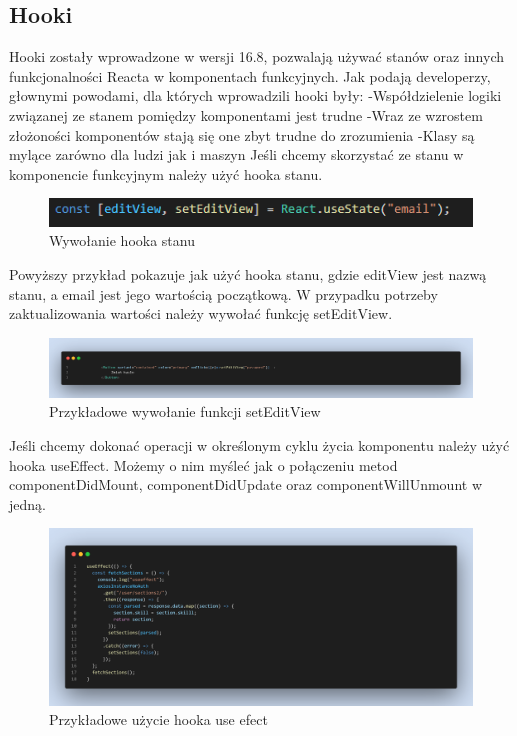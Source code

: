 \documentclass[oneside,polski,logo,indent]{amuthesis}
\begin{document}
\begin{enumerate}
\begin{enumerate}
\begin{figure}[H]
\end{figure}


\subsection{Hooki}
Hooki zostały wprowadzone w wersji 16.8, pozwalają używać stanów oraz innych funkcjonalności Reacta w komponentach funkcyjnych.
\newline
Jak podają developerzy, głownymi powodami, dla których wprowadzili hooki były:
\newline -Współdzielenie logiki związanej ze stanem pomiędzy komponentami jest trudne
\newline -Wraz ze wzrostem złożoności komponentów stają się one zbyt trudne do zrozumienia
\newline -Klasy są mylące zarówno dla ludzi jak i maszyn
\newline
Jeśli chcemy skorzystać ze stanu w komponencie funkcyjnym należy użyć hooka stanu.

\begin{figure}[H]
\centering
\includegraphics[width=13cm]{hook stanu.png}
\caption{Wywołanie hooka stanu
}

\end{figure}	

Powyższy przykład pokazuje jak użyć hooka stanu, gdzie editView jest nazwą stanu, a email jest jego wartością początkową. W przypadku potrzeby zaktualizowania wartości należy 
wywołać funkcję setEditView.

\begin{figure}[H]
\centering
\includegraphics[width=13cm]{zmiana stanu hook.png}
\caption{Przykładowe wywołanie funkcji setEditView
}

\end{figure}	

Jeśli chcemy dokonać operacji w określonym cyklu życia komponentu należy użyć hooka useEffect. Możemy o nim myśleć jak o połączeniu metod componentDidMount, componentDidUpdate oraz componentWillUnmount w jedną.

\begin{figure}[H]
\centering
\includegraphics[width=13cm]{use effect przyklad.png}
\caption{Przykładowe użycie hooka use efect
}


\end{figure}
\end{enumerate}
\end{enumerate}
\end{document}
